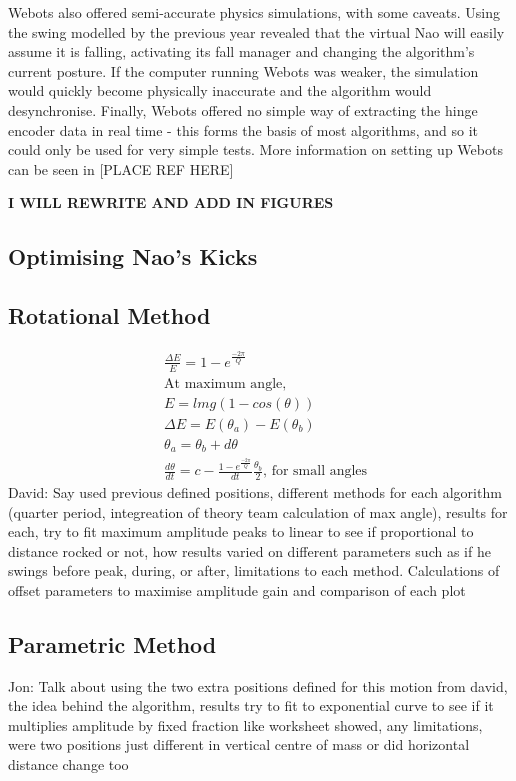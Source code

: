 \documentclass[11pt]{article}
\begin{document}
Webots also offered semi-accurate physics simulations, with some caveats. Using the swing modelled by the previous year revealed that the virtual Nao will easily assume it is falling, activating its fall manager and changing the algorithm's current posture. If the computer running Webots was weaker, the simulation would quickly become physically inaccurate and the algorithm would desynchronise. Finally, Webots offered no simple way of extracting the hinge encoder data in real time - this forms the basis of most algorithms, and so it could only be used for very simple tests. More information on setting up Webots can be seen in [PLACE REF HERE]

\textbf{I WILL REWRITE AND ADD IN FIGURES}



\subsection{Optimising Nao's Kicks}

\subsection{Rotational Method}

\begin{align}
    &\frac{\Delta E}{E} = 1 - e^{\frac{-2\pi}{Q}}\\
    &\text{At maximum angle},\\
    &E = lmg(1-cos(\theta))\\
    &\Delta E = E(\theta_a) - E(\theta_b)\\
    &\theta_a = \theta_b + d\theta\\
    &\frac{d\theta}{dt} = c - \frac{1-e^{\frac{-2\pi}{Q}}}{dt}\frac{\theta_b}{2}, \, \text{for small angles}
\end{align}
David: Say used previous defined positions, different methods for each algorithm (quarter period, integreation of theory team calculation of max angle), results for each, try to fit maximum amplitude peaks to linear to see if proportional to distance rocked or not, how results varied on different parameters such as if he swings before peak, during, or after, limitations to each method.
Calculations of offset parameters to maximise amplitude gain and comparison of each plot

\subsection{Parametric Method}
Jon: Talk about using the two extra positions defined for this motion from david, the idea behind the algorithm, results try to fit to exponential curve to see if it multiplies amplitude by fixed fraction like worksheet showed, any limitations, were two positions just different in vertical centre of mass or did horizontal distance change too
\end{document}
